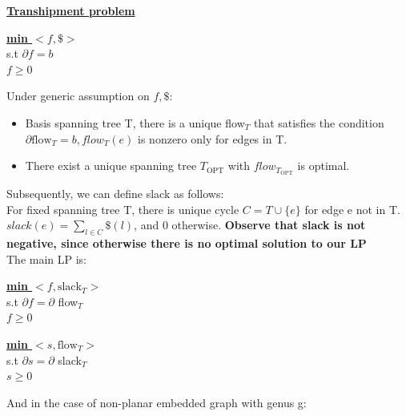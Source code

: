 \documentclass{article}
\begin{document}
\textbf{\underline{Transhipment problem}}

\begin{center}
\begin{algorithm}
\textbf{\underline{min $<f, \$>$}} \\
  s.t  $\partial f = b$ \\ \qquad
       $f \geq 0$
\end{algorithm}
\end{center}

Under generic assumption on $f, \$$:
\begin{itemize}
\item Basis spanning tree T, there is a unique flow$_T$ that satisfies the 
condition $\partial \text{flow}_T = b, flow_T (e)$ is nonzero only for edges in T.
\item There exist a unique spanning tree $T_{\text{OPT}}$ with $flow_{T_\text{OPT}}$ 
is optimal.
\end{itemize}

Subsequently, we can define slack as follows: \\
For fixed spanning tree T, there is unique cycle $C = T \cup \{e\}$ for edge e 
not in T. $slack(e) = \sum_{l \in C} \$(l)$, and 0 otherwise.
\textbf{Observe that slack is not negative, since otherwise there is no optimal solution to our LP} \\
The main LP is:\\


\begin{minipage}[t]{0.48\linewidth}
\begin{center}
\begin{algorithm}
\textbf{\underline{min $<f, \text{slack}_{T}>$}} \\
  s.t  $\partial f =\partial $  flow$_T$ \\ \qquad
       $f \geq 0$
\end{algorithm}
\end{center}
\end{minipage}
\hfill
\begin{minipage}[t]{0.48\linewidth}
\begin{algorithm}
\textbf{\underline{min $<s, \text{flow}_{T}>$}} \\
  s.t  $\partial s = \partial $ slack$_T$ \\ \qquad
       $s \geq 0$
\end{algorithm}
\end{minipage}

\vspace{0.3 cm}
And in the case of non-planar embedded graph with genus g:
\vspace{0.1 cm}
\end{document}
